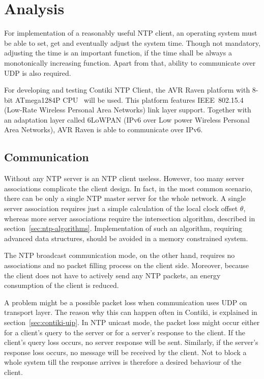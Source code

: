 
\chapter{Analysis}
For implementation of a reasonably useful NTP client,
an operating system must be able to set, get and eventually adjust the system time.
Though not mandatory, adjusting the time is an important function,
if the time shall be always a monotonically increasing function.
Apart from that, ability to communicate over UDP is also required.

For developing and testing Contiki NTP Client,
the AVR Raven platform with 8-bit ATmega1284P CPU~\cite{avr-datasheet} will be used.
This platform features IEEE~802.15.4 (Low-Rate Wireless Personal Area Networks) link layer support.
Together with an adaptation layer called 6LoWPAN (IPv6 over Low power Wireless Personal Area Networks),
AVR Raven is able to communicate over IPv6.






\section{Communication}
Without any NTP server is an NTP client useless. %
However, too many server associations complicate the client design.
In fact, in the most common scenario, there can be only a single NTP master server
for the whole network.
A single server association requires just a simple calculation of the local clock offset
$\theta$, whereas more server associations require the intersection algorithm,
described in section~\ref{sec:ntp-algorithms}.
Implementation of such an algorithm, requiring advanced data structures, should be avoided
in a memory constrained system.

The NTP broadcast communication mode, on the other hand,
requires no associations and no packet filling process on the client side.
Moreover, because the client does not have to actively send any NTP packets,
an energy consumption of the client is reduced.

A problem might be a possible packet loss when communication uses UDP on transport layer.
The reason why this can happen often in Contiki, is explained in section~\ref{sec:contiki-uip}.
In NTP unicast mode, the packet loss might occur either for a client's query to the server
or for a server's response to the client.
If the client's query loss occurs, no server response will be sent.
Similarly, if the server's response loss occurs, no message will be received by the client.
Not to block a whole system till the response arrives
is therefore a desired behaviour of the client.


